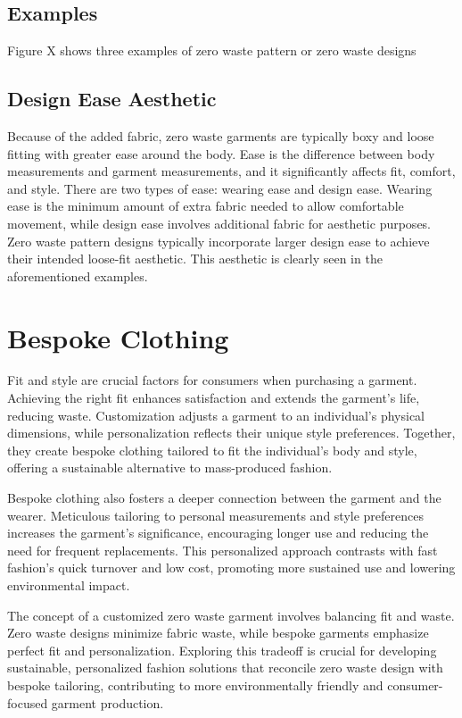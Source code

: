 \subsection{Examples}
Figure X shows three examples of zero waste pattern or zero waste designs

\subsection{Design Ease Aesthetic}
Because of the added fabric, zero waste garments are typically boxy and loose fitting with greater ease around the body. Ease is the difference between body measurements and garment measurements, and it significantly affects fit, comfort, and style. There are two types of ease: wearing ease and design ease. Wearing ease is the minimum amount of extra fabric needed to allow comfortable movement, while design ease involves additional fabric for aesthetic purposes. Zero waste pattern designs typically incorporate larger design ease to achieve their intended loose-fit aesthetic. This aesthetic is clearly seen in the aforementioned examples.

\section{Bespoke Clothing}
Fit and style are crucial factors for consumers when purchasing a garment. Achieving the right fit enhances satisfaction and extends the garment's life, reducing waste. Customization adjusts a garment to an individual's physical dimensions, while personalization reflects their unique style preferences. Together, they create bespoke clothing tailored to fit the individual's body and style, offering a sustainable alternative to mass-produced fashion.

Bespoke clothing also fosters a deeper connection between the garment and the wearer. Meticulous tailoring to personal measurements and style preferences increases the garment's significance, encouraging longer use and reducing the need for frequent replacements. This personalized approach contrasts with fast fashion's quick turnover and low cost, promoting more sustained use and lowering environmental impact.

The concept of a customized zero waste garment involves balancing fit and waste. Zero waste designs minimize fabric waste, while bespoke garments emphasize perfect fit and personalization. Exploring this tradeoff is crucial for developing sustainable, personalized fashion solutions that reconcile zero waste design with bespoke tailoring, contributing to more environmentally friendly and consumer-focused garment production.

